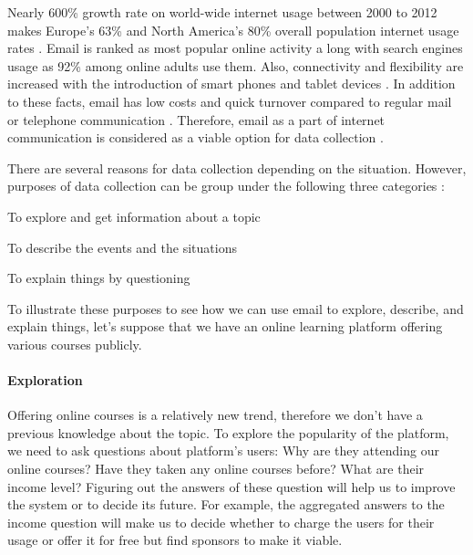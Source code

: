Nearly 600\% growth rate on world-wide internet usage between 2000 to 2012 makes Europe's 63\% and North America's 80\% overall population internet usage rates \citep{InternetWorldStats2012}. Email is ranked as most popular online activity a long with search engines usage as 92\% among online adults use them\citep{Purcell2011}. Also, connectivity and flexibility are increased with the introduction of smart phones and tablet devices \citep{Madden2008}. In addition to these facts, email has low costs and quick turnover compared to regular mail or telephone communication \citep{Zikmund2007}. Therefore, email as a part of internet communication is considered as a viable option for data collection \citep{Zikmund2007}.
\vspace{1cm}

There are several reasons for data collection depending on the situation. However, purposes of data collection can be group under the following three categories \citep[pages 92--94]{Babbie2010}:

\begin{compactenum}
	\item To explore and get information about a topic
	\item To describe the events and the situations
	\item To explain things by questioning
\end{compactenum}

To illustrate these purposes to see how we can use email to explore, describe, and explain things, let's suppose that we have an online learning platform offering various courses publicly.

\paragraph{Exploration}
Offering online courses is a relatively new trend, therefore we don't have a previous knowledge about the topic. To explore the popularity of the platform, we need to ask questions about platform's users: Why are they attending our online courses? Have they taken any online courses before? What are their income level? Figuring out the answers of these question will help us to improve the system or to decide its future. For example, the aggregated answers to the income question will make us to decide whether to charge the users for their usage or offer it for free but find sponsors to make it viable.

